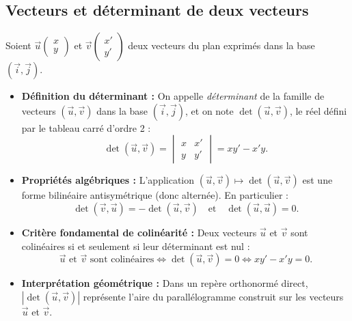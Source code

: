 \documentclass[11pt,a4paper]{article}
\renewcommand{\det}{\operatorname{det}}
\begin{document}
\subsection{Vecteurs et déterminant de deux vecteurs}
Soient $\vec{u}\begin{pmatrix} x \\ y \end{pmatrix}$ et $\vec{v}\begin{pmatrix} x' \\ y' \end{pmatrix}$ deux vecteurs du plan exprimés dans la base $(\vec{i}, \vec{j})$.
\begin{itemize}[leftmargin=1.5cm]
    \item \textbf{Définition du déterminant :} On appelle \emph{déterminant} de la famille de vecteurs $(\vec{u}, \vec{v})$ dans la base $(\vec{i}, \vec{j})$, et on note $\det(\vec{u}, \vec{v})$, le réel défini par le tableau carré d'ordre 2 :
    \[
    \det(\vec{u}, \vec{v}) = \begin{vmatrix} x & x' \\ y & y' \end{vmatrix} = x y' - x' y.
    \]
    \item \textbf{Propriétés algébriques :} L'application $(\vec{u}, \vec{v}) \mapsto \det(\vec{u}, \vec{v})$ est une forme bilinéaire antisymétrique (donc alternée). En particulier :
    \[
    \det(\vec{v}, \vec{u}) = -\det(\vec{u}, \vec{v}) \quad \text{et} \quad \det(\vec{u}, \vec{u}) = 0.
    \]
    \item \textbf{Critère fondamental de colinéarité :} Deux vecteurs $\vec{u}$ et $\vec{v}$ sont colinéaires si et seulement si leur déterminant est nul :
    \[
    \vec{u} \text{ et } \vec{v} \text{ sont colinéaires} \iff \det(\vec{u}, \vec{v}) = 0 \iff x y' - x' y = 0.
    \]
    \item \textbf{Interprétation géométrique :} Dans un repère orthonormé direct, $|\det(\vec{u}, \vec{v})|$ représente l'aire du parallélogramme construit sur les vecteurs $\vec{u}$ et $\vec{v}$.
\end{itemize}
\end{document}
